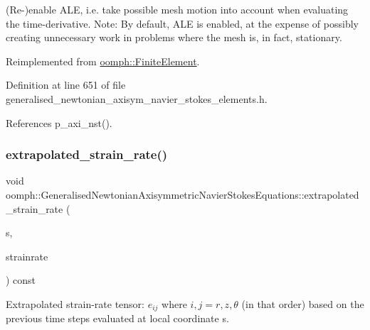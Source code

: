 (Re-\/)enable A\+LE, i.\+e. take possible mesh motion into account when evaluating the time-\/derivative. Note\+: By default, A\+LE is enabled, at the expense of possibly creating unnecessary work in problems where the mesh is, in fact, stationary. 



Reimplemented from \hyperlink{classoomph_1_1FiniteElement_a92ef8967fa4e2d6c33c51ea3efa3aa82}{oomph\+::\+Finite\+Element}.



Definition at line 651 of file generalised\+\_\+newtonian\+\_\+axisym\+\_\+navier\+\_\+stokes\+\_\+elements.\+h.



References p\+\_\+axi\+\_\+nst().

\mbox{\label{classoomph_1_1GeneralisedNewtonianAxisymmetricNavierStokesEquations_a3cdd9fa7fe22e5ce5de8451b6a1e7270}} 
\subsubsection{\texorpdfstring{extrapolated\+\_\+strain\+\_\+rate()}{extrapolated\_strain\_rate()}\hspace{0.1cm}{\footnotesize\ttfamily [1/2]}}
{\footnotesize\ttfamily void oomph\+::\+Generalised\+Newtonian\+Axisymmetric\+Navier\+Stokes\+Equations\+::extrapolated\+\_\+strain\+\_\+rate (\begin{DoxyParamCaption}\item[{const \hyperlink{classoomph_1_1Vector}{Vector}$<$ double $>$ \&}]{s,  }\item[{\hyperlink{classoomph_1_1DenseMatrix}{Dense\+Matrix}$<$ double $>$ \&}]{strainrate }\end{DoxyParamCaption}) const\hspace{0.3cm}{\ttfamily [virtual]}}



Extrapolated strain-\/rate tensor\+: $ e_{ij} $ where $ i,j = r,z,\theta $ (in that order) based on the previous time steps evaluated at local coordinate s. 

